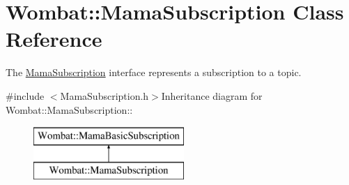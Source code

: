 \hypertarget{classWombat_1_1MamaSubscription}{
\section{Wombat::MamaSubscription Class Reference}
\label{classWombat_1_1MamaSubscription}
}


The {\ttfamily \hyperlink{classWombat_1_1MamaSubscription}{MamaSubscription}} interface represents a subscription to a topic.  


{\ttfamily \#include $<$MamaSubscription.h$>$}Inheritance diagram for Wombat::MamaSubscription::\begin{figure}[H]
\begin{center}
\leavevmode
\includegraphics[height=2cm]{classWombat_1_1MamaSubscription}
\end{center}
\end{figure}
